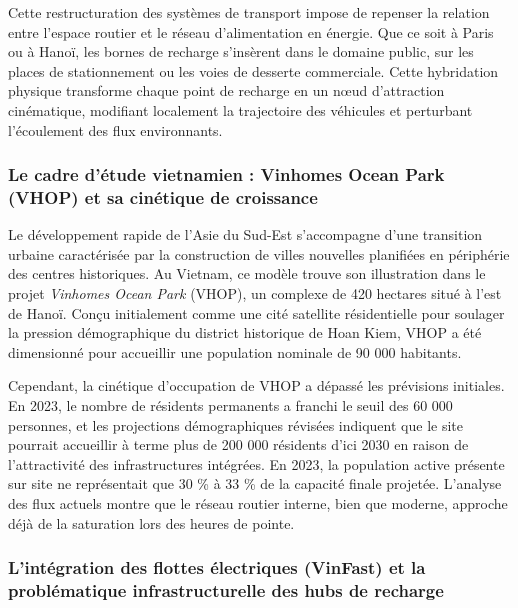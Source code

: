 \documentclass[11pt, a4paper]{article}
\begin{document}
Cette restructuration des systèmes de transport impose de repenser la
relation entre l'espace routier et le réseau d'alimentation en énergie.
Que ce soit à Paris ou à Hanoï, les bornes de recharge s'insèrent dans
le domaine public, sur les places de stationnement ou les voies de
desserte commerciale. Cette hybridation physique transforme chaque point
de recharge en un nœud d'attraction cinématique, modifiant localement la
trajectoire des véhicules et perturbant l'écoulement des flux
environnants.

\subsubsection{Le cadre d'étude vietnamien : Vinhomes Ocean Park (VHOP)
et sa cinétique de
croissance}\label{le-cadre-duxe9tude-vietnamien-vinhomes-ocean-park-vhop-et-sa-cinuxe9tique-de-croissance}

Le développement rapide de l'Asie du Sud-Est s'accompagne d'une
transition urbaine caractérisée par la construction de villes nouvelles
planifiées en périphérie des centres historiques. Au Vietnam, ce modèle
trouve son illustration dans le projet \emph{Vinhomes Ocean Park}
(VHOP), un complexe de 420 hectares situé à l'est de Hanoï. Conçu
initialement comme une cité satellite résidentielle pour soulager la
pression démographique du district historique de Hoan Kiem, VHOP a été
dimensionné pour accueillir une population nominale de 90 000 habitants.

Cependant, la cinétique d'occupation de VHOP a dépassé les prévisions
initiales. En 2023, le nombre de résidents permanents a franchi le seuil
des 60 000 personnes, et les projections démographiques révisées
indiquent que le site pourrait accueillir à terme plus de 200 000
résidents d'ici 2030 en raison de l'attractivité des infrastructures
intégrées. En 2023, la population active présente sur site ne
représentait que 30 \% à 33 \% de la capacité finale projetée. L'analyse
des flux actuels montre que le réseau routier interne, bien que moderne,
approche déjà de la saturation lors des heures de pointe.

\subsubsection{L'intégration des flottes électriques (VinFast) et la
problématique infrastructurelle des hubs de
recharge}\label{lintuxe9gration-des-flottes-uxe9lectriques-vinfast-et-la-probluxe9matique-infrastructurelle-des-hubs-de-recharge}
\end{document}
